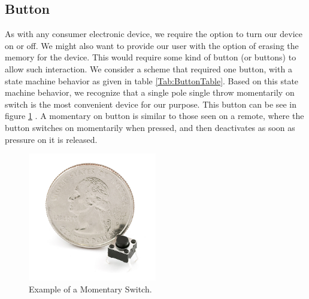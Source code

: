 \subsection{Button}
\label{Sec:Button}
As with any consumer electronic device, we require the option to turn our device on or off. We might also want to provide our user with the option of erasing the memory for the device. This would require some kind of button (or buttons) to allow such interaction. We consider a scheme that required one button, with a state machine behavior as given in table \ref{Tab:ButtonTable}. Based on this state machine behavior, we recognize that a single pole single throw momentarily on switch is the most convenient device for our purpose. This button can be see in figure \ref{Fig:MomButton} \cite{Web:SFEMOM}.
A momentary on button is similar to those seen on a remote, where the button switches on momentarily when pressed, and then deactivates as soon as pressure on it is released.
\begin{figure}
\begin{center}
\includegraphics[width=0.5\textwidth]{images/MOMButton.jpg}
\caption{Example of a Momentary Switch.}
\label{Fig:MomButton}
\end{center}
\end{figure}


